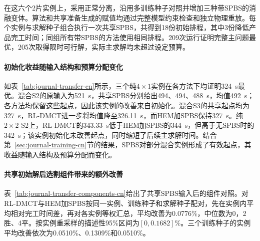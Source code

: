 在这六个2片实例上，采用正常分离，沿用多训练种子对照并增加三种带SPBS的消融变体。算法和共享准备生成的赋值均通过完整模型约束检查和独立物理重放。每个实例与求解种子组合执行一次共享SPBS，共得到18份初始排程，其中3份降低产品完工时间；同组所有带SPBS的方法使用相同排程。209次运行证明完整主问题最优，205次取得限时可行解，实际主求解均未超过设定预算。

\paragraph{初始化收益随输入结构和预算分配变化}

如表~\ref{tab:journal-transfer-cn}所示，三个纯$4\times1$实例在各方法下均证明324~s最优。混合S2的原输入为521~s，共享SPBS分别给出494、494、488~s，均值492~s；各方法均保留这些起点，因此该实例的改善来自初始化。混合S3的共享起点均为327~s，RL-DMCT进一步将均值降至326.11~s，而HEM加SPBS保持327~s。纯$2\times2$ S2上，RL-DMCT的343.33~s低于HEM加SPBS的344~s，但高于无SPBS时的342~s；该实例初始化未改善起点，同时缩短了后续主求解时间。结合第~\ref{sec:journal-training-cn}节的结果，SPBS对部分混合实例形成了有效起点，其收益随输入结构及预算分配而变化。

\paragraph{共享初始解后选割组件带来的额外改善}

表~\ref{tab:journal-transfer-components-cn}给出了共享SPBS输入后的组件对照。对RL-DMCT与HEM加SPBS按同一实例、训练种子和求解种子配对，先在实例内平均相对完工时间差，再对各实例等权汇总，平均改善为0.0776\%，中位数为0，2胜、4平。按实例重采样的描述性95\%区间为$[0,0.1682]\%$。三个训练种子的实例平均改善依次为0.0510\%、0.1309\%和0.0510\%。

\begin{table}[!htbp]
\centering\small
\caption{共享SPBS输入的组件对照（产品完工均值，s）}
\label{tab:journal-transfer-components-cn}
\end{table}

